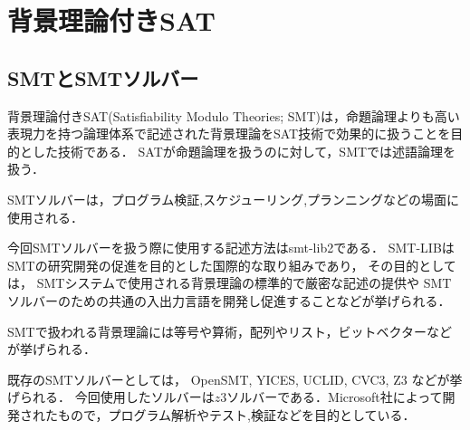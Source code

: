 \chapter{背景理論付きSAT}\label{chap:smt}

%
%
\section{SMTとSMTソルバー}
背景理論付きSAT(Satisfiability Modulo Theories; SMT)は，命題論理よりも高い表現力を持つ論理体系で記述された背景理論をSAT技術で効果的に扱うことを目的とした技術である．
SATが命題論理を扱うのに対して，SMTでは述語論理を扱う\cite{JSAI:IwanumaN10}．

%
%
SMTソルバーは，プログラム検証,スケジューリング,プランニングなどの場面に使用される．


今回SMTソルバーを扱う際に使用する記述方法はsmt-lib2\cite{SMTLIBTh1:online}である．
SMT-LIBはSMTの研究開発の促進を目的とした国際的な取り組みであり，
その目的としては，
SMTシステムで使用される背景理論の標準的で厳密な記述の提供や
SMTソルバーのための共通の入出力言語を開発し促進することなどが挙げられる．




SMTで扱われる背景理論には等号や算術，配列やリスト，ビットベクターなどが挙げられる．

既存のSMTソルバーとしては，
OpenSMT\cite{OpenSMTF14:online},
YICES\cite{TheYices43:online},
UCLID\cite{GitHubuc34:online},
CVC3\cite{CVC3page2:online},
Z3\cite{GitHubZ389:online}
などが挙げられる．
今回使用したソルバーは$z3ソルバー$である．Microsoft社によって開発されたもので，プログラム解析やテスト,検証などを目的としている\cite{Umemura10:jssst}．


